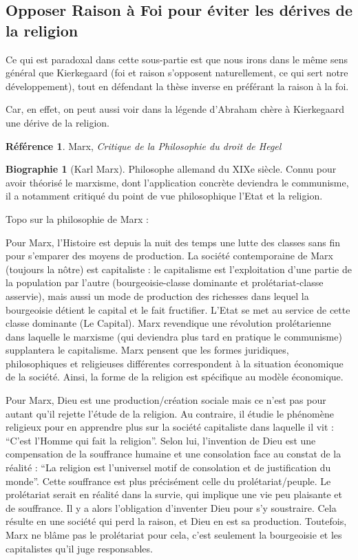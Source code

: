 \documentclass[french]{book}
\theoremstyle{definition}
\newtheorem*{refe}{Référence}
\newtheorem*{bio}{Biographie}
\begin{document}
\subsection{Opposer Raison à Foi pour éviter les dérives de la religion}

Ce qui est paradoxal dans cette sous-partie est que nous irons dans le même sens général que Kierkegaard (foi et raison s’opposent naturellement, ce qui sert notre développement), tout en défendant la thèse inverse en préférant la raison à la foi.

Car, en effet, on peut aussi voir dans la légende d’Abraham chère à Kierkegaard une dérive de la religion.

\begin{refe}
	Marx, \textit{Critique de la Philosophie du droit de Hegel}
\end{refe}

\begin{bio}[Karl Marx]
	Philosophe allemand du XIXe siècle. Connu pour avoir théorisé le marxisme, dont l’application concrète deviendra le communisme, il a notamment critiqué du point de vue philosophique l’Etat et la religion.
\end{bio}

Topo sur la philosophie de Marx :

Pour Marx, l’Histoire est depuis la nuit des temps une lutte des classes sans fin pour s’emparer des moyens de production. La société contemporaine de Marx (toujours la nôtre) est capitaliste : le capitalisme est l'exploitation d’une partie de la population par l’autre (bourgeoisie-classe dominante et prolétariat-classe asservie), mais aussi un mode de production des richesses dans lequel la bourgeoisie détient le capital et le fait fructifier. L’Etat se met au service de cette classe dominante (Le Capital). Marx revendique une révolution prolétarienne dans laquelle le marxisme (qui deviendra plus tard en pratique le communisme) supplantera le capitalisme. Marx pensent que les formes juridiques, philosophiques et religieuses différentes correspondent à la situation économique de la société. Ainsi, la forme de la religion est spécifique au modèle économique.

Pour Marx, Dieu est une production/création sociale mais ce n’est pas pour autant qu’il rejette l'étude de la religion. Au contraire, il étudie le phénomène religieux pour en apprendre plus sur la société capitaliste dans laquelle il vit : “C’est l’Homme qui fait la religion”. Selon lui, l’invention de Dieu est une compensation de la souffrance humaine et une consolation face au constat de la réalité : “La religion est l’universel motif de consolation et de justification du monde”. Cette souffrance est plus précisément celle du prolétariat/peuple. Le prolétariat serait en réalité dans la survie, qui implique une vie peu plaisante et de souffrance. Il y a alors l’obligation d’inventer Dieu pour s’y soustraire. Cela résulte en une société qui perd la raison, et Dieu en est sa production. Toutefois, Marx ne blâme pas le prolétariat pour cela, c’est seulement la bourgeoisie et les capitalistes qu’il juge responsables.
\end{document}

